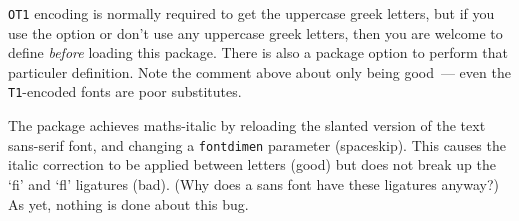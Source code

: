 \documentclass[a4paper]{article}
\begin{document}
\texttt{OT1} encoding is normally required to get the uppercase greek
letters, but if you use the \option[EULERGREEK] option or don't use
any uppercase greek letters, then you are welcome to define
 \emph{before} loading this package.  There is
also a package option \option[T1] to perform that particuler
definition.  Note the comment above about only  being
good~--- even the \texttt{T1}-encoded  fonts are poor
substitutes.

The package achieves maths-italic by reloading the slanted version of
the text sans-serif font, and changing a \texttt{fontdimen} parameter
(spaceskip).  This causes the italic correction to be applied between
letters (good) but does not break up the `fi' and `fl' ligatures
(bad).  (Why does a sans font have these ligatures anyway?)  As yet,
nothing is done about this bug.
\end{document}
